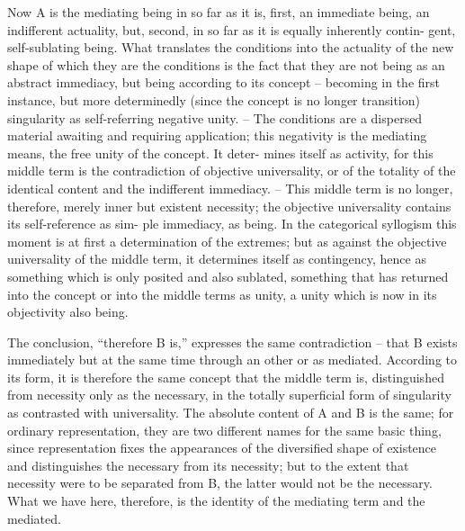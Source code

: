 Now A is the mediating being in so far as it is, first, an immediate being,
an indifferent actuality, but, second, in so far as it is equally inherently contin-
gent, self-sublating being. What translates the conditions into the actuality
of the new shape of which they are the conditions is the fact that they
are not being as an abstract immediacy, but being according to its concept –
becoming in the first instance, but more determinedly (since the concept
is no longer transition) singularity as self-referring negative unity. – The
conditions are a dispersed material awaiting and requiring application; this
negativity is the mediating means, the free unity of the concept. It deter-
mines itself as activity, for this middle term is the contradiction of objective
universality, or of the totality of the identical content and the indifferent
immediacy. – This middle term is no longer, therefore, merely inner but
existent necessity; the objective universality contains its self-reference as sim-
ple immediacy, as being. In the categorical syllogism this moment is at first
a determination of the extremes; but as against the objective universality
of the middle term, it determines itself as contingency, hence as something
which is only posited and also sublated, something that has returned into
the concept or into the middle terms as unity, a unity which is now in its
objectivity also being.

The conclusion, “therefore B is,” expresses the same contradiction – that
B exists immediately but at the same time through an other or as mediated.
According to its form, it is therefore the same concept that the middle term
is, distinguished from necessity only as the necessary, in the totally superficial
form of singularity as contrasted with universality. The absolute content of
A and B is the same; for ordinary representation, they are two different
names for the same basic thing, since representation fixes the appearances
of the diversified shape of existence and distinguishes the necessary from
its necessity; but to the extent that necessity were to be separated from B,
the latter would not be the necessary. What we have here, therefore, is the
identity of the mediating term and the mediated.

